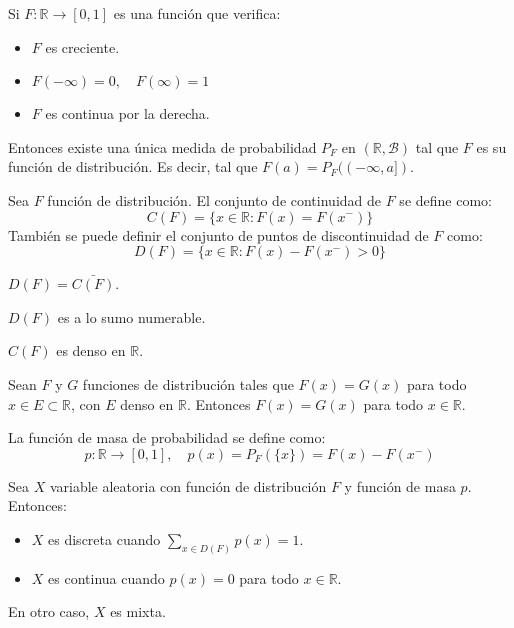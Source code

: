 \begin{theorem}
    Si $F: \mathbb{R} \to [0, 1]$ es una función que verifica:
    \begin{itemize}
        \item $F$ es creciente.
        \item $F(-\infty) = 0, \quad F(\infty) = 1$
        \item $F$ es continua por la derecha.
    \end{itemize}
    Entonces existe una única medida de probabilidad $P_F$ en $(\mathbb{R}, \mathcal{B})$ tal que $F$ es su función de distribución.
    Es decir, tal que $F(a) = P_F((-\infty, a])$.
\end{theorem}

\begin{definition}
    Sea $F$ función de distribución.
    El conjunto de continuidad de $F$ se define como:
    $$C(F) = \{ x \in \mathbb{R} : F(x) = F(x^-) \}$$
    También se puede definir el conjunto de puntos de discontinuidad de $F$ como:
    $$D(F) = \{ x \in \mathbb{R} : F(x) - F(x^-) > 0 \}$$
\end{definition}

\begin{remark}
    $D(F) = \bar{C(F)}$.
\end{remark}

\begin{proposition}
    $D(F)$ es a lo sumo numerable.
\end{proposition}

\begin{corollary}
    $C(F)$ es denso en $\mathbb{R}$.
\end{corollary}

\begin{proposition}
    Sean $F$ y $G$ funciones de distribución tales que $F(x) = G(x)$ para todo $x \in E \subset \mathbb{R}$, con $E$ denso en $\mathbb{R}$.
    Entonces $F(x) = G(x)$ para todo $x \in \mathbb{R}$.
\end{proposition}

\begin{definition}
    La función de masa de probabilidad se define como:
    $$p : \mathbb{R} \to [0, 1], \quad p(x) = P_F(\{x\}) = F(x) - F(x^-)$$
\end{definition}

\begin{definition}
    Sea $X$ variable aleatoria con función de distribución $F$ y función de masa $p$.
    Entonces:
    \begin{itemize}
        \item $X$ es discreta cuando $\sum_{x \in D(F)} p(x) = 1$.
        \item $X$ es continua cuando $p(x) = 0$ para todo $x \in \mathbb{R}$.
    \end{itemize}
    En otro caso, $X$ es mixta.
\end{definition}

